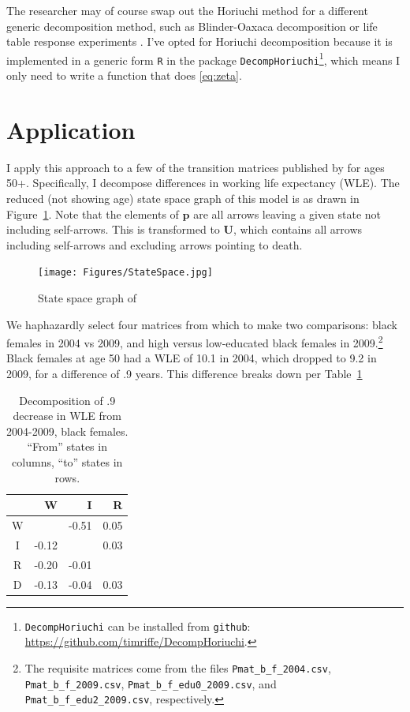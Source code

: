 \documentclass{article}
\begin{document}
The researcher may of course swap out the Horiuchi method for a different
generic decomposition method, such as Blinder-Oaxaca decomposition
\citep{blinder1973wage, oaxaca1973male} or life table response experiments
\citep{caswell1989analysis}. I've opted for Horiuchi decomposition because it is
implemented in a generic form \texttt{R} in the package
\texttt{DecompHoriuchi}\footnote{\texttt{DecompHoriuchi} can be installed from
\texttt{github}: \url{https://github.com/timriffe/DecompHoriuchi}.}, which means
I only need to write a function that does \eqref{eq:zeta}.

\section{Application}
I apply this approach to a few of the transition matrices published
by \citet{Dudel2017} for ages 50+. Specifically, I decompose differences in
working life expectancy (WLE). The reduced (not showing
age) state space graph of this model is as drawn in Figure~\ref{fig:dudelstates}. Note that the elements of $\textbf{p}$ are all arrows leaving a given state not including self-arrows. This is transformed to $\textbf{U}$, which contains all
arrows including self-arrows and excluding arrows pointing to death. 

\begin{figure}[ht!]
\begin{center}
\caption{State space graph of \citet{Dudel2017}}
\label{fig:dudelstates}
\texttt{[image: Figures/StateSpace.jpg]}
\end{center}
\end{figure}

We haphazardly select four matrices from which to make two comparisons: black
females in 2004 vs 2009, and high versus low-educated black females in
2009.\footnote{The requisite matrices come from the files
\texttt{Pmat\_b\_f\_2004.csv}, \texttt{Pmat\_b\_f\_2009.csv}, \texttt{Pmat\_b\_f\_edu0\_2009.csv}, and
\texttt{Pmat\_b\_f\_edu2\_2009.csv}, respectively. } Black females at age 50 had
a WLE of 10.1 in 2004, which dropped to 9.2 in 2009, for a difference of .9
years. This difference breaks down per Table~\ref{tab:A}
\FloatBarrier
\begin{table}[ht]
\centering
\caption{Decomposition of .9 decrease in WLE from 2004-2009, black females.
``From'' states in columns, ``to'' states in rows.}
\label{tab:A}
\begin{tabular}{c|rrr}
 & W & I & R \\ 
  \hline
W &  & -0.51 & 0.05 \\ 
  I & -0.12 &  & 0.03 \\ 
  R & -0.20 & -0.01 &  \\ 
  D & -0.13 & -0.04 & 0.03 \\ 
   \hline
\end{tabular}
\end{table}
\end{document}
